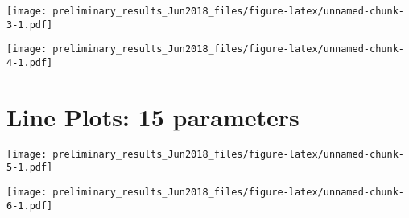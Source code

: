 \documentclass[12pt,]{article}
\begin{document}
\texttt{[image: preliminary\_results\_Jun2018\_files/figure-latex/unnamed-chunk-3-1.pdf]}

\texttt{[image: preliminary\_results\_Jun2018\_files/figure-latex/unnamed-chunk-4-1.pdf]}

\hypertarget{line-plots-15-parameters}{%
\section{Line Plots: 15 parameters}\label{line-plots-15-parameters}}

\texttt{[image: preliminary\_results\_Jun2018\_files/figure-latex/unnamed-chunk-5-1.pdf]}

\texttt{[image: preliminary\_results\_Jun2018\_files/figure-latex/unnamed-chunk-6-1.pdf]}
\end{document}
